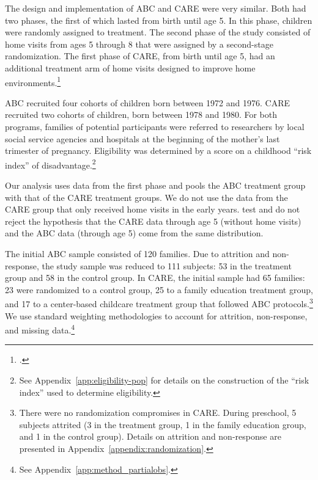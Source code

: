The design and implementation of ABC and CARE were very similar. Both had two phases, the first of which lasted from birth until age 5. In this phase, children were randomly assigned to treatment. The second phase of the study consisted of home visits from ages 5 through 8 that were assigned by a second-stage randomization. The first phase of CARE, from birth until age 5, had an additional treatment arm of home visits designed to improve home environments.\footnote{\citet{Wasik_Ramey_etal_1990_CD}.}

ABC recruited four cohorts of children born between 1972 and 1976. CARE recruited two cohorts of children, born between 1978 and 1980. For both programs, families of potential participants were referred to researchers by local social service agencies and hospitals at the beginning of the mother's last trimester of pregnancy. Eligibility was determined by a score on a childhood ``risk index'' of disadvantage.\footnote{See  Appendix~\ref{app:eligibility-pop} for details on the construction of the ``risk index'' used to determine eligibility.}

Our analysis uses data from the first phase and pools the ABC treatment group with that of the CARE treatment groups. We do not use the data from the CARE group that only received home visits in the early years. \cite{Campbell_Conti_etal_2014_EarlyChildhoodInvestments} test and do not reject the hypothesis that the CARE data through age 5 (without home visits) and the ABC data (through age 5) come from the same distribution.

The initial ABC sample consisted of 120 families. Due to attrition and non-response, the study sample was reduced to 111 subjects: 53 in the treatment group and 58 in the control group. In CARE, the initial sample had 65 families: 23 were randomized to a control group, 25 to a family education treatment group, and 17 to a center-based childcare treatment group that followed ABC protocols.\footnote{There were no randomization compromises in CARE. During preschool, 5 subjects attrited (3 in the treatment group, 1 in the family education group, and 1 in the control group). Details on attrition and non-response are presented in Appendix~\ref{appendix:randomization}.} We use standard weighting methodologies to account for attrition, non-response, and missing data.\footnote{See Appendix~\ref{app:method_partialobs}.}

